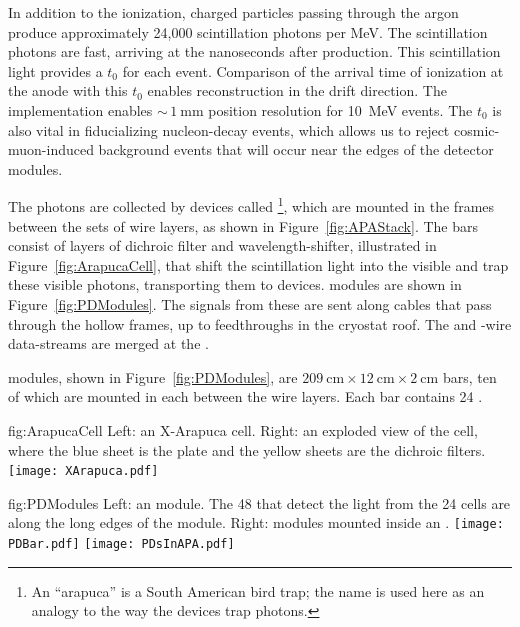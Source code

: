 In addition to the ionization, charged particles passing through the argon produce approximately 24,000 scintillation photons per \si{\mega\electronvolt}. The scintillation photons are fast, arriving at the  nanoseconds after production. This scintillation light provides a $t_{0}$ for each event. Comparison of the arrival time of ionization at the anode with this $t_{0}$ enables reconstruction in the drift direction. 
The  implementation enables $\sim\,\SI{1}{\mm}$ position resolution for \SI{10}{\mega\electronvolt}  events. The  $t_{0}$ is also vital in fiducializing nucleon-decay events, which allows us to reject cosmic-muon-induced background events that will occur near the edges of the detector modules.

The photons are collected by devices called \footnote{An ``arapuca'' is a South American bird trap; the name is used here as an analogy to the way the devices trap photons.}, which are mounted in the  frames between the sets of wire layers, as shown in Figure~\ref{fig:APAStack}. 
The  bars consist of layers of dichroic filter and wavelength-shifter, illustrated in Figure~\ref{fig:ArapucaCell}, that shift the  scintillation light into the visible and trap these visible photons, transporting them to  devices.  modules are shown in Figure~\ref{fig:PDModules}. The signals from these  are sent along cables that pass through the hollow  frames, up to feedthroughs in the cryostat roof. The  and -wire data-streams are merged at the .

 modules, shown in Figure~\ref{fig:PDModules}, are 
$\SI{209}{\cm}\times\SI{12}{\cm}\times\SI{2}{\cm}$ bars, ten of which are mounted in each  between the wire layers. Each bar contains 24 .



\begin{dunefigure}{fig:ArapucaCell}
{Left: an X-Arapuca cell. Right: an exploded view of the cell, where the blue sheet is the  plate and the yellow sheets are the dichroic filters.}
\texttt{[image: XArapuca.pdf]}
\end{dunefigure}

\begin{dunefigure}{fig:PDModules}
{Left: an   module. The 48  that detect the light from the 24 cells are along the long edges of the module. Right:   modules mounted inside an .}
\texttt{[image: PDBar.pdf]}
\texttt{[image: PDsInAPA.pdf]}
\end{dunefigure}


